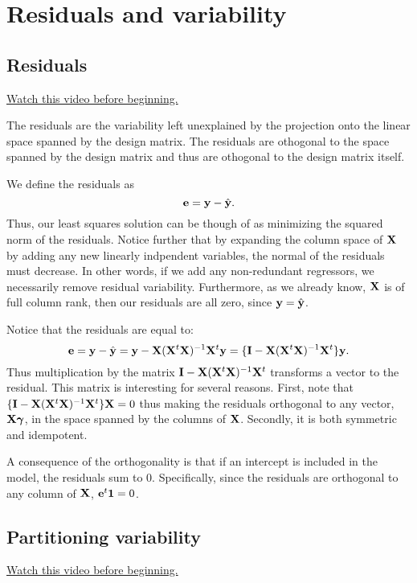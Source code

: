 \chapter{Residuals and variability}

\section{Residuals}

\href{https://www.youtube.com/watch?v=sYFWVRglLLY&index=36&list=PLpl-gQkQivXhdgUCdaUQcdb31CRe8Mm2y}{Watch this video before beginning.}

The residuals are the variability left unexplained by the projection 
onto the linear space spanned by the design matrix. The residuals
are othogonal to the space spanned by the design matrix and thus
are othogonal to the design matrix itself.

We define the residuals as
$$
\mathbf{e} = \mathbf{y} - \hat {\mathbf{y}}.
$$
Thus, our least squares solution can be though of as minimizing
the squared norm of the residuals. Notice further that by
expanding the column space of $\mathbf{X}$ by adding any new
linearly indpendent variables, the normal of the residuals
must decrease. In other words, if we add any non-redundant
regressors, we necessarily remove residual variability. Furthermore,
as we already know, $\mathbf{X}$ is of full column rank, then our residuals
are all zero, since $\mathbf{y} = \hat {\mathbf{y}}$. 

 Notice that the residuals are equal to:
$$
\mathbf{e} = \mathbf{y} - \hat {\mathbf{y}} = \mathbf{y} - \mathbf{X} (\mathbf{X}^t \mathbf{X})^{-1} \mathbf{X}^t \mathbf{y} = \{\mathbf{I} - \mathbf{X} (\mathbf{X}^t \mathbf{X})^{-1} \mathbf{X}^t\} \mathbf{y}.
$$
Thus multiplication by the matrix $\mathbf{I} - \mathbf{X} (\mathbf{X}^t \mathbf{X})^{-1} \mathbf{X}^t$ transforms a
vector to the residual. This matrix is interesting for several reasons.
First, note that $\{\mathbf{I} - \mathbf{X} (\mathbf{X}^t \mathbf{X})^{-1} \mathbf{X}^t\} \mathbf{X} = 0$ thus making the residuals
orthogonal to any vector, $\mathbf{X} \boldsymbol{\gamma}$, in the space spanned by the
columns of $\mathbf{X}$. Secondly, it is both symmetric and idempotent. 

A consequence of the orthogonality is that if an intercept is
included in the model, the residuals sum to 0. Specifically,
since the residuals are orthogonal to any column of $\mathbf{X}$, 
$\mathbf{e}^t \mathbf{1} = 0$.

\section{Partitioning variability}

\href{https://www.youtube.com/watch?v=uv3yZWGyE2Y&index=37&list=PLpl-gQkQivXhdgUCdaUQcdb31CRe8Mm2y}{Watch this video before beginning.}

